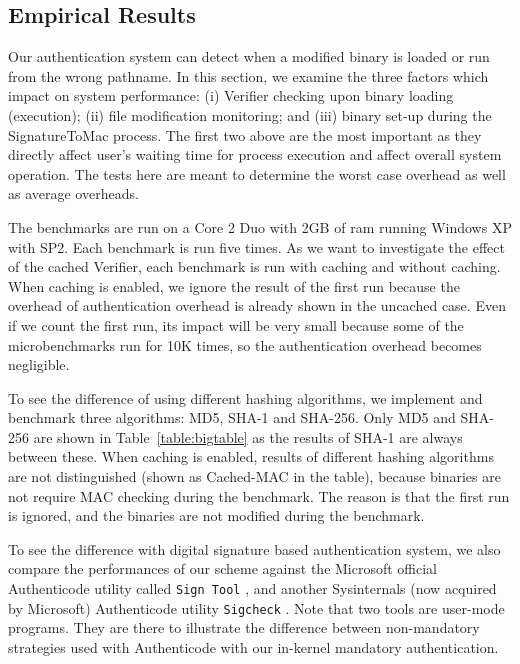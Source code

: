 \subsection{Empirical Results}
\label{sec:binauth-cost}

Our authentication system can detect when a modified binary is loaded
or run from the wrong pathname. In this section, we examine
the three factors which impact on system performance:
(i) Verifier checking upon binary loading (execution);
(ii) file modification monitoring; and
(iii) binary set-up during the SignatureToMac process.
The first two above are the most important as they directly 
affect user's waiting time for process execution and 
affect overall system operation.
The tests here are meant to determine the worst case overhead as well
as average overheads.

The benchmarks are run on a Core 2 Duo with 2GB of ram
running Windows XP with SP2.
Each benchmark is run five times.
As we want to investigate the effect of the cached Verifier,
each benchmark is run with caching and without caching.
When caching is enabled, we ignore the result of the first run because
the overhead of authentication overhead is already shown in the uncached case.
Even if we count the first run, its impact will be very small because
some of the microbenchmarks run for 10K times, so the authentication
overhead becomes negligible.

To see the difference of using different hashing algorithms, we implement
and benchmark three algorithms: MD5, SHA-1 and SHA-256.
Only MD5 and SHA-256 are shown in Table~\ref{table:bigtable} as
the results of SHA-1 are always between these.
When caching is enabled, results of different hashing algorithms are
not distinguished (shown as Cached-MAC in the table),
because binaries are not require MAC checking during the benchmark.
The reason is that the first run is ignored, and the binaries are not modified
during the benchmark.

To see the difference with digital signature based authentication system,
we also compare the performances of our scheme against
the Microsoft official Authenticode utility called {\tt Sign Tool} \cite{signtool},
and another Sysinternals (now acquired by Microsoft) Authenticode utility
{\tt Sigcheck} \cite{sigcheck}.
Note that two tools are user-mode programs.
They are there to illustrate the difference between non-mandatory strategies
used with Authenticode with our in-kernel mandatory authentication.

